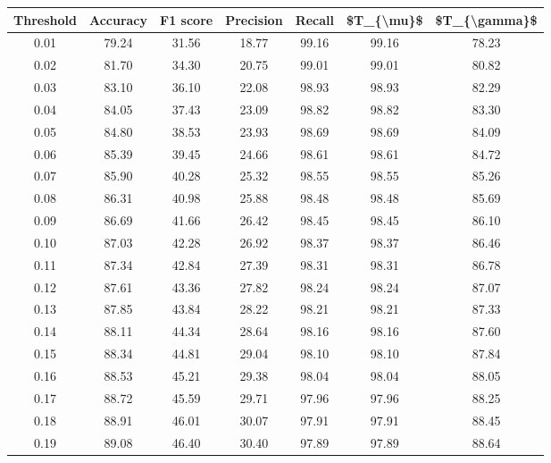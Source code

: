 \begin{tabular}{|c|c|c|c|c|c|c|}
\hline
 Threshold &  Accuracy &  F1 score &  Precision &  Recall &  \$T\_\{\textbackslash mu\}\$ &  \$T\_\{\textbackslash gamma\}\$ \\
\hline
      0.01 &     79.24 &     31.56 &      18.77 &   99.16 &      99.16 &         78.23 \\
      0.02 &     81.70 &     34.30 &      20.75 &   99.01 &      99.01 &         80.82 \\
      0.03 &     83.10 &     36.10 &      22.08 &   98.93 &      98.93 &         82.29 \\
      0.04 &     84.05 &     37.43 &      23.09 &   98.82 &      98.82 &         83.30 \\
      0.05 &     84.80 &     38.53 &      23.93 &   98.69 &      98.69 &         84.09 \\
      0.06 &     85.39 &     39.45 &      24.66 &   98.61 &      98.61 &         84.72 \\
      0.07 &     85.90 &     40.28 &      25.32 &   98.55 &      98.55 &         85.26 \\
      0.08 &     86.31 &     40.98 &      25.88 &   98.48 &      98.48 &         85.69 \\
      0.09 &     86.69 &     41.66 &      26.42 &   98.45 &      98.45 &         86.10 \\
      0.10 &     87.03 &     42.28 &      26.92 &   98.37 &      98.37 &         86.46 \\
      0.11 &     87.34 &     42.84 &      27.39 &   98.31 &      98.31 &         86.78 \\
      0.12 &     87.61 &     43.36 &      27.82 &   98.24 &      98.24 &         87.07 \\
      0.13 &     87.85 &     43.84 &      28.22 &   98.21 &      98.21 &         87.33 \\
      0.14 &     88.11 &     44.34 &      28.64 &   98.16 &      98.16 &         87.60 \\
      0.15 &     88.34 &     44.81 &      29.04 &   98.10 &      98.10 &         87.84 \\
      0.16 &     88.53 &     45.21 &      29.38 &   98.04 &      98.04 &         88.05 \\
      0.17 &     88.72 &     45.59 &      29.71 &   97.96 &      97.96 &         88.25 \\
      0.18 &     88.91 &     46.01 &      30.07 &   97.91 &      97.91 &         88.45 \\
      0.19 &     89.08 &     46.40 &      30.40 &   97.89 &      97.89 &         88.64 \\

\end{tabular}
